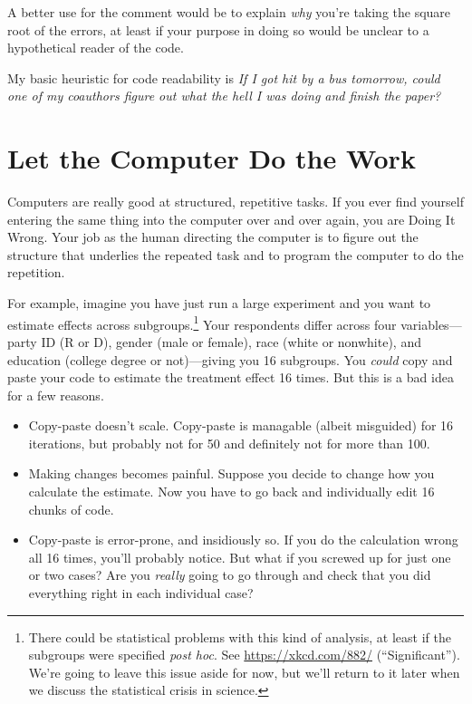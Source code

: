 \documentclass[
  12pt,
  oneside,openany]{book}
\begin{document}
A better use for the comment would be to explain \emph{why} you're taking the square root of the errors, at least if your purpose in doing so would be unclear to a hypothetical reader of the code.

My basic heuristic for code readability is \emph{If I got hit by a bus tomorrow, could one of my coauthors figure out what the hell I was doing and finish the paper?}

\hypertarget{let-the-computer-do-the-work}{%
\section{Let the Computer Do the Work}\label{let-the-computer-do-the-work}}

Computers are really good at structured, repetitive tasks. If you ever find yourself entering the same thing into the computer over and over again, you are Doing It Wrong. Your job as the human directing the computer is to figure out the structure that underlies the repeated task and to program the computer to do the repetition.

For example, imagine you have just run a large experiment and you want to estimate effects across subgroups.\footnote{There could be statistical problems with this kind of analysis, at least if the subgroups were specified \emph{post hoc}. See \url{https://xkcd.com/882/} (``Significant''). We're going to leave this issue aside for now, but we'll return to it later when we discuss the statistical crisis in science.} Your respondents differ across four variables---party ID (R or D), gender (male or female), race (white or nonwhite), and education (college degree or not)---giving you 16 subgroups. You \emph{could} copy and paste your code to estimate the treatment effect 16 times. But this is a bad idea for a few reasons.

\begin{itemize}
\item
  Copy-paste doesn't scale. Copy-paste is managable (albeit misguided) for 16 iterations, but probably not for 50 and definitely not for more than 100.
\item
  Making changes becomes painful. Suppose you decide to change how you calculate the estimate. Now you have to go back and individually edit 16 chunks of code.
\item
  Copy-paste is error-prone, and insidiously so. If you do the calculation wrong all 16 times, you'll probably notice. But what if you screwed up for just one or two cases? Are you \emph{really} going to go through and check that you did everything right in each individual case?
\end{itemize}
\end{document}
